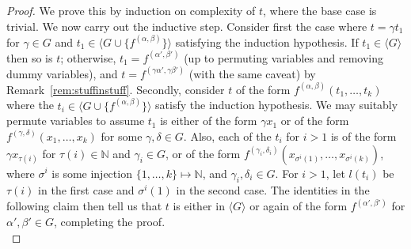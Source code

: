 \documentclass{article}
\theoremstyle{remark}
\theoremstyle{definition}
\begin{document}
\begin{proof} We prove this by induction on complexity of $t$, where the base case is trivial. We now carry out the inductive step.
{Consider first the case where $t=\gamma t_1$ for $\gamma\in G$ and $t_1\in\langle G \cup \{f^{(\alpha, \beta)}\}\rangle$ satisfying the induction hypothesis. If $t_1\in\langle G\rangle$ then so is $t$; otherwise,  $t_1=f^{(\alpha',\beta')}$ (up to permuting variables and removing dummy variables), and $t=f^{(\gamma \alpha',\gamma\beta')}$ (with the same caveat) by Remark~\ref{rem:stuffinstuff}.}
{Secondly, consider $t$ of the form}
$f^{(\alpha, \beta)}(t_1, \dots, t_k)$ where the $t_i\in\langle G \cup \{f^{(\alpha, \beta)}\}\rangle$ {satisfy the induction hypothesis.} %
We may suitably permute variables to {assume $t_1$} is %
either of the form %
$\gamma x_1$ or of the form $f^{(\gamma, \delta)}(x_1, \dots, x_k)$ for some $\gamma, \delta\in G$. Also, %
 each of the $t_i$ for $i>1$ is of the form $\gamma x_{\tau(i)}$ for $\tau(i)\in\mathbb{N}$ and $\gamma_i\in G$, or of the form $f^{(\gamma_i, \delta_i)}(x_{\sigma^i(1)}, \dots, x_{\sigma^i(k)})$, where $\sigma^i$ is some injection $\{1, \dots, k\}\mapsto\mathbb{N}$, and $\gamma_i, \delta_i\in G$. For $i>1$, let $l(t_i)$ be $\tau(i)$ in the first case and $\sigma^i(1)$ in the second case. The identities in the following claim then tell us that {$t$} is either in $\langle G\rangle$ or again of the form $f^{(\alpha', \beta')}$ for $\alpha', \beta'\in G$, completing the proof.\\


\end{proof}
\end{document}
